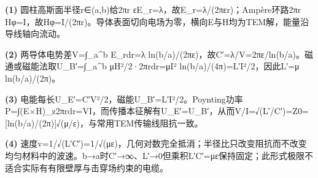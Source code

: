 \par\noindent\textbf{(1)} 圆柱高斯面半径r∈(a,b)给2πr εE\_r=λ，故E\_r=λ/(2πεr)；Ampère环路2πr Hφ=I，故Hφ=I/(2πr)。导体表面切向电场为零，横向E与H均为TEM解，能量沿导线轴向流动。
\par\noindent\textbf{(2)} 两导体电势差V=∫\_a\textasciicircum{}b E\_rdr=λ ln(b/a)/(2πε)，故C′=λ/V=2πε/ln(b/a)。磁通或磁能法取U\_B′=∫\_a\textasciicircum{}b μH²/2·2πrdr=μI² ln(b/a)/(4π)=L′I²/2，因此L′=μ ln(b/a)/(2π)。
\par\noindent\textbf{(3)} 电能每长U\_E′=C′V²/2，磁能U\_B′=L′I²/2。Poynting功率P=∫(E×H)\_z2πrdr=VI，而传播本征解有U\_E′=U\_B′，从而V/I=√(L′/C′)=Z0=[ln(b/a)/(2π)]√(μ/ε)，与常用TEM传输线阻抗一致。
\par\noindent\textbf{(4)} 速度v=1/√(L′C′)=1/√(με)，几何对数完全抵消；半径比只改变阻抗而不改变均匀材料中的波速。b→a时C′→∞、L′→0但乘积L′C′=με保持固定；此形式极限不适合实际有有限壁厚与击穿场约束的电缆。
